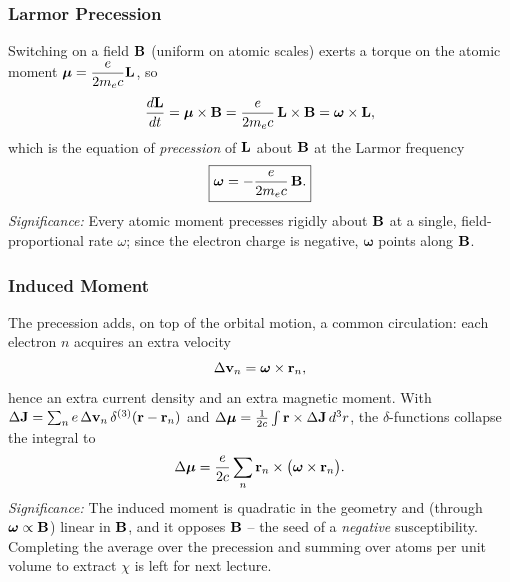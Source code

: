 \subsubsection*{Larmor Precession}
Switching on a field $\mathbf{B}$ (uniform on atomic scales) exerts a torque on the atomic moment
$\boldsymbol{\mu}=\dfrac{e}{2m_ec}\mathbf{L}$, so
\begin{equation}\label{eq:lec18-torque}
  \frac{d\mathbf{L}}{dt}=\boldsymbol{\mu}\times\mathbf{B}
  =\frac{e}{2m_ec}\,\mathbf{L}\times\mathbf{B}
  =\boldsymbol{\omega}\times\mathbf{L},
\end{equation}
which is the equation of \emph{precession} of $\mathbf{L}$ about $\mathbf{B}$ at the Larmor
frequency
\begin{equation}\label{eq:lec18-larmor}
  \boxed{\boldsymbol{\omega}=-\frac{e}{2m_ec}\,\mathbf{B}.}
\end{equation}
\textit{Significance:} Every atomic moment precesses rigidly about $\mathbf{B}$ at a single,
field-proportional rate $\omega$; since the electron charge is negative, $\boldsymbol{\omega}$
points along $\mathbf{B}$.

\subsubsection*{Induced Moment}
The precession adds, on top of the orbital motion, a common circulation: each electron
$n$ acquires an extra velocity
\begin{equation}\label{eq:lec18-deltav}
  \Delta\mathbf{v}_n=\boldsymbol{\omega}\times\mathbf{r}_n,
\end{equation}
hence an extra current density and an extra magnetic moment. With
$\Delta\mathbf{J}=\sum_n e\,\Delta\mathbf{v}_n\,\delta^{(3)}(\mathbf{r}-\mathbf{r}_n)$ and
$\Delta\boldsymbol{\mu}=\tfrac{1}{2c}\int \mathbf{r}\times\Delta\mathbf{J}\,d^3r$, the $\delta$-functions collapse
the integral to
\begin{equation}\label{eq:lec18-deltamu}
  \Delta\boldsymbol{\mu}=\frac{e}{2c}\sum_{n}\mathbf{r}_n\times\bigl(\boldsymbol{\omega}\times\mathbf{r}_n\bigr).
\end{equation}
\textit{Significance:} The induced moment is quadratic in the geometry and (through
$\boldsymbol{\omega}\propto\mathbf{B}$) linear in $\mathbf{B}$, and it opposes $\mathbf{B}$ -- the seed of a
\emph{negative} susceptibility. Completing the average over the precession and summing
over atoms per unit volume to extract $\chi$ is left for next lecture.


